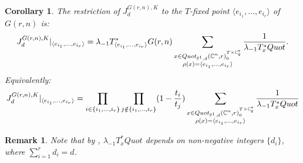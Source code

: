\documentclass{amsart}
\newtheorem{Corollary}[thm]{Corollary}
\newtheorem{remark}[thm]{Remark}
\begin{document}
\begin{Corollary}\label{Khaste}
     The restriction of $J_d^{G(r,n),K}$ to the $T$-fixed point $\langle e_{i_1}, \dots,e_{i_r}\rangle$ of $G(r,n)$ is:
     \[
    {J_d^{G(r,n),K}}\arrowvert_{\langle e_{i_1}, \dots,e_{i_r}\rangle} = \lambda_{-1}T^*_{\langle e_{i_1}, \dots,e_{i_r}\rangle}G(r,n)\sum_{\substack{x \in Quot_{\mathbb{P}^1,d}(\mathbb{C}^n,r)_{0}^{T \times \mathbb{C}_q^*} \\ \rho(x) = \langle e_{i_1}, \ldots, e_{i_r} \rangle}} \frac{1}{\lambda_{-1}T^*_{x}Quot}.
    \]
    Equivalently:
    \[
     {J_d^{G(r,n),K}}\arrowvert_{\langle e_{i_1}, \dots,e_{i_r}\rangle} =\prod_{i \in \{i_1,\dots,i_r\} } \prod_{j \notin \{i_1,\dots,i_r\} }(1-\frac{t_i}{t_j})  \sum_{\substack{x \in Quot_{\mathbb{P}^1,d}(\mathbb{C}^n,r)_{0}^{T \times \mathbb{C}_q^*} \\ \rho(x) = \langle e_{i_1}, \ldots, e_{i_r} \rangle}} \frac{1}{\lambda_{-1}T^*_{x}Quot}
     \]
     
    \end{Corollary}
    \begin{remark}
        Note that by ,  $\lambda_{-1}T_{x}^*Quot$ depends on non-negative integers $\{d_i\}$, where $\sum_{i=1}^r d_i = d$. 
    \end{remark}
\end{document}

